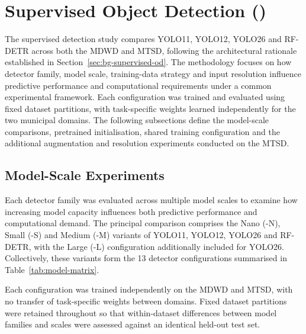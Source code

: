 \newpage 
\section{Supervised Object Detection ()}
\label{sec:supervised-detection-methodology}
The supervised detection study compares \gls{YOLO}11, \gls{YOLO}12, \gls{YOLO}26 and \gls{RF-DETR} across both the \gls{MDWD} and \gls{MTSD}, following the architectural rationale established in Section~\ref{sec:bg-supervised-od}. The methodology focuses on how detector family, model scale, training-data strategy and input resolution influence predictive performance and computational requirements under a common experimental framework. Each configuration was trained and evaluated using fixed dataset partitions, with task-specific weights learned independently for the two municipal domains. The following subsections define the model-scale comparisons, pretrained initialisation, shared training configuration and the additional augmentation and resolution experiments conducted on the \gls{MTSD}.

\subsection{Model-Scale Experiments}
\label{sec:supervised-model-ablation}
Each detector family was evaluated across multiple model scales to examine how increasing model capacity influences both predictive performance and computational demand. The principal comparison comprises the Nano (-N), Small (-S) and Medium (-M) variants of \gls{YOLO}11, \gls{YOLO}12, \gls{YOLO}26 and \gls{RF-DETR}, with the Large (-L) configuration additionally included for \gls{YOLO}26. Collectively, these variants form the 13 detector configurations summarised in Table~\ref{tab:model-matrix}.

Each configuration was trained independently on the \gls{MDWD} and \gls{MTSD}, with no transfer of task-specific weights between domains. Fixed dataset partitions were retained throughout so that within-dataset differences between model families and scales were assessed against an identical held-out test set.

